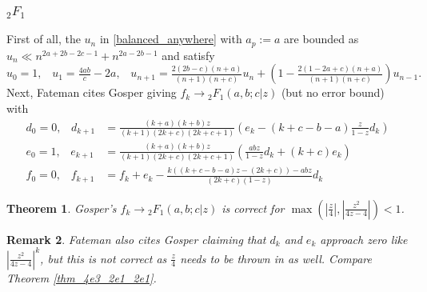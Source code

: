 \documentclass[12pt]{article}
\numberwithin{equation}{section}
\newtheorem{theorem}{Theorem}[section]
\newtheorem{remark}[theorem]{Remark}
\newcommand{\Head}[3] {{}_{#1}{#2}_{#3}}
\begin{document}
\subsubsection{$\Head{2}{F}{1}$}
First of all, the $u_n$ in \eqref{balanced_anywhere} with $a_p:=a$ are bounded as $u_n \ll n^{2a+2b-2c-1} + n^{2a-2b-1}$ and satisfy
\begin{equation*}
u_0 = 1\text{,} \quad u_1 = \tfrac{4ab}{c}-2a\text{,} \quad 
u_{n+1} = \tfrac{2(2b-c)(n+a)}{(n+1)(n+c)} u_n + (1-\tfrac{2(1-2a+c)(n+a)}{(n+1)(n+c)}) u_{n-1}\text{.}
\end{equation*}
Next, Fateman cites Gosper giving $f_k \to \Head{2}{F}{1}(a,b;c|z)$ (but no error bound) with 
\begin{equation*}
\begin{aligned}
d_0 = 0\text{,} \quad d_{k+1} & = \tfrac{(k+a)(k+b)z}{(k+1)(2k+c)(2k+c+1)}(e_k-(k+c-b-a)\tfrac{z}{1-z} d_k)\\
e_0 =1\text{,} \quad e_{k+1} & = \tfrac{(k+a)(k+b)z}{(k+1)(2k+c)(2k+c+1)}(\tfrac{a b z}{1-z} d_k+(k+c) e_k)\\
f_0 = 0\text{,} \quad f_{k+1} &= f_{k} + e_k - \tfrac{k((k+c-b-a)z-(2k+c))-a b z}{(2k+c)(1-z)} d_k
\end{aligned}
\end{equation*}
\begin{theorem}
Gosper's $f_k \to \Head{2}{F}{1}(a,b;c|z)$ is correct for $\max(|\frac{z}{4}|,|\frac{z^2}{4z-4}|)<1$.
\end{theorem}
\begin{remark}
Fateman also cites Gosper claiming that $d_k$ and $e_k$ approach zero like $|\frac{z^2}{4z-4}|^k$, but this is not correct as $\frac{z}{4}$ needs to be thrown in as well. Compare Theorem \ref{thm_4e3_2e1_2e1}.
\end{remark}
\end{document}

